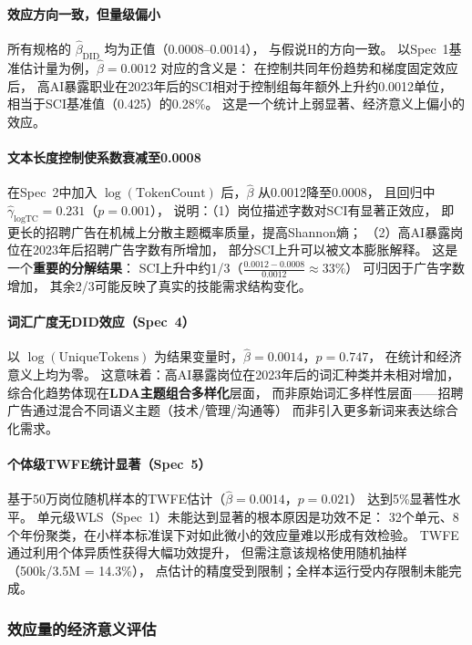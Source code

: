 \documentclass[12pt,a4paper]{ctexart}
\begin{document}
\paragraph{效应方向一致，但量级偏小}
所有规格的 $\hat{\beta}_{\text{DID}}$ 均为正值（$0.0008$--$0.0014$），
与假说H的方向一致。
以Spec~1基准估计量为例，$\hat{\beta} = 0.0012$ 对应的含义是：
在控制共同年份趋势和梯度固定效应后，
高AI暴露职业在2023年后的SCI相对于控制组每年额外上升约0.0012单位，
相当于SCI基准值（0.425）的0.28\%。
这是一个统计上弱显著、经济意义上偏小的效应。

\paragraph{文本长度控制使系数衰减至0.0008}
在Spec~2中加入 $\log(\text{TokenCount})$ 后，$\hat{\beta}$ 从0.0012降至0.0008，
且回归中 $\hat{\gamma}_{\log\text{TC}} = 0.231$（$p = 0.001$），
说明：（1）岗位描述字数对SCI有显著正效应，
即更长的招聘广告在机械上分散主题概率质量，提高Shannon熵；
（2）高AI暴露岗位在2023年后招聘广告字数有所增加，
部分SCI上升可以被文本膨胀解释。
这是一个\textbf{重要的分解结果}：
SCI上升中约1/3（$\frac{0.0012 - 0.0008}{0.0012} \approx 33\%$）
可归因于广告字数增加，
其余2/3可能反映了真实的技能需求结构变化。

\paragraph{词汇广度无DID效应（Spec~4）}
以 $\log(\text{UniqueTokens})$ 为结果变量时，$\hat{\beta} = 0.0014$，$p = 0.747$，
在统计和经济意义上均为零。
这意味着：高AI暴露岗位在2023年后的词汇种类并未相对增加，
综合化趋势体现在\textbf{LDA主题组合多样化}层面，
而非原始词汇多样性层面——招聘广告通过混合不同语义主题（技术/管理/沟通等）
而非引入更多新词来表达综合化需求。

\paragraph{个体级TWFE统计显著（Spec~5）}
基于50万岗位随机样本的TWFE估计（$\hat{\beta} = 0.0014$，$p = 0.021$）
达到5\%显著性水平。
单元级WLS（Spec~1）未能达到显著的根本原因是功效不足：
32个单元、8个年份聚类，在小样本标准误下对如此微小的效应量难以形成有效检验。
TWFE通过利用个体异质性获得大幅功效提升，
但需注意该规格使用随机抽样（500k/3.5M = 14.3\%），
点估计的精度受到限制；全样本运行受内存限制未能完成。

\subsubsection{效应量的经济意义评估}
\end{document}
